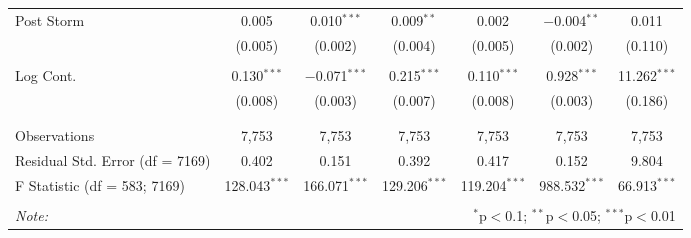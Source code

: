 \begin{table}[!htbp]
\begin{tabular}{@{\extracolsep{5pt}}lcccccc}
 Post Storm & 0.005 & 0.010$^{***}$ & 0.009$^{**}$ & 0.002 & $-$0.004$^{**}$ & 0.011 \\ 
  & (0.005) & (0.002) & (0.004) & (0.005) & (0.002) & (0.110) \\ 
  & & & & & & \\ 
 Log Cont. & 0.130$^{***}$ & $-$0.071$^{***}$ & 0.215$^{***}$ & 0.110$^{***}$ & 0.928$^{***}$ & 11.262$^{***}$ \\ 
  & (0.008) & (0.003) & (0.007) & (0.008) & (0.003) & (0.186) \\ 
  & & & & & & \\ 
\hline \\[-1.8ex] 
Observations & 7,753 & 7,753 & 7,753 & 7,753 & 7,753 & 7,753 \\ 
Residual Std. Error (df = 7169) & 0.402 & 0.151 & 0.392 & 0.417 & 0.152 & 9.804 \\ 
F Statistic (df = 583; 7169) & 128.043$^{***}$ & 166.071$^{***}$ & 129.206$^{***}$ & 119.204$^{***}$ & 988.532$^{***}$ & 66.913$^{***}$ \\ 
\hline 
\hline \\[-1.8ex] 
\textit{Note:}  & \multicolumn{6}{r}{$^{*}$p$<$0.1; $^{**}$p$<$0.05; $^{***}$p$<$0.01} \\ 
\end{tabular} 
\end{table} 
